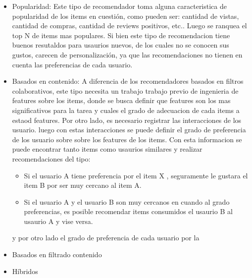 \documentclass[11pt,a4paper,twoside]{tesis}
\begin{document}
\begin{itemize}

\item Popularidad: Este tipo de recomendador toma alguna caracteristica de popularidad de los items en cuestión, como pueden ser: cantidad de vistas, cantidad de compras, cantidad de reviews positivos, etc.. Luego se ranquea el top N de items mas populares. Si bien este tipo de recomendacion tiene buenos resutaldos para usaurios nuevos, de los cuales no se conocen sus gustos, carecen de personalización, ya que las recomendaciones no tienen en cuenta las preferencias de cada usuario.

\item Basados en contenido: A diferencia de los recomendadores basados en filtros colaborativos, este tipo necesita un trabajo trabajo previo de ingenieria de features sobre los items, donde se busca definir que features son los mas significativos para la tarea y cuales el grado de adecuacion de cada items a estaod features. Por otro lado, es necesario registrar las interacciones de los usuario. luego con estas interacciones se puede definir el grado de preferencia de los usuario sobre sobre los features de los items. Con esta informacion se puede encontrar tanto items como usaurios similares y realizar recomendaciones del tipo:

\begin{itemize}

\item Si el usuario A tiene preferencia por el item X , seguramente le gustara el item B por ser muy cercano al item A.
\item Si el usuario A y el usuario B son muy cercanos en cuando al grado preferencias, es posible recomendar items consumidos el usaurio B al usaurio A y vise versa.

\end{itemize}


y por otro lado el grado de preferencia de cada usuario por la

\item Basados en filtrado contenido

\item Híbridos

\end{itemize}	
\end{document}
